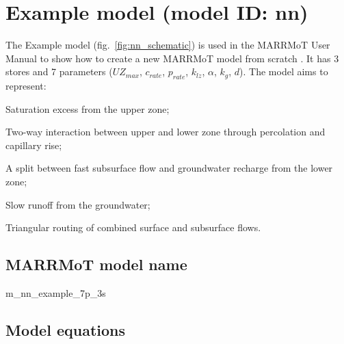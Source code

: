 \section*{Example model (model ID: nn)}
The Example model (fig.~\ref{fig:nn_schematic}) is used in the MARRMoT User Manual to show how to create a new MARRMoT model from scratch \citep{Knoben2018b}. It has 3 stores and 7 parameters ($UZ_{max}$, $c_{rate}$, $p_{rate}$, $k_{lz}$, $ \alpha$, $k_{g}$, $d$). The model aims to represent:

\begin{itemizecompact}
\item Saturation excess from the upper zone;
\item Two-way interaction between upper and lower zone through percolation and capillary rise;
\item A split between fast subsurface flow and groundwater recharge from the lower zone;
\item Slow runoff from the groundwater;
\item Triangular routing of combined surface and subsurface flows.
\end{itemizecompact}

\subsection*{MARRMoT model name}
m\_nn\_example\_7p\_3s \\

\subsection*{Model equations}

